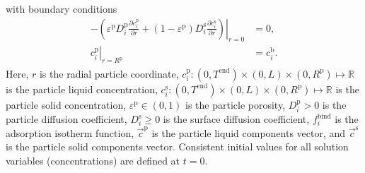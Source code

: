 \documentclass{article}
\begin{document}
with boundary conditions
\begin{align}
- \left. \left( \varepsilon^{\mathrm{p}} D^{\mathrm{p}}_{i} \frac{\partial c^{\mathrm{p}}_{i}}{\partial r} + (1 - \varepsilon^{\mathrm{p}}) D^{\mathrm{s}}_{i} \frac{\partial c^{\mathrm{s}}_{i}}{\partial r} \right) \right|_{r=0}
&= 0, \\
\left. c^{\mathrm{p}}_{i} \right|_{r = R^{\mathrm{p}}_{}} &= c^{\mathrm{b}}_i.\end{align}
Here, $r$ is the radial particle coordinate, $c^{\mathrm{p}}_{i}\colon  (0, T^\mathrm{end}) \times (0, L)\times (0, R^{\mathrm{p}}) \mapsto \mathbb{R}$ is the particle liquid concentration, $c^{\mathrm{s}}_{i}\colon  (0, T^\mathrm{end}) \times (0, L)\times (0, R^{\mathrm{p}}) \mapsto \mathbb{R}$ is the particle solid concentration, $\varepsilon^{\mathrm{p}}\in (0, 1)$ is the particle porosity, $D^\mathrm{p}_{i}> 0$ is the particle diffusion coefficient, $D^\mathrm{s}_{i}\geq 0$ is the surface diffusion coefficient, $f^\mathrm{bind}_{i}$ is the adsorption isotherm function, $\vec{c}^\mathrm{p}$ is the particle liquid components vector, and $\vec{c}^\mathrm{s}$ is the particle solid components vector.
Consistent initial values for all solution variables (concentrations) are defined at $t = 0$.
\end{document}
